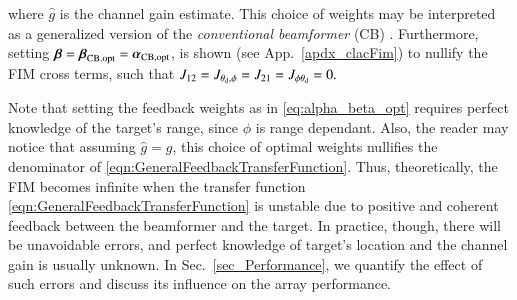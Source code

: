where $\hat{g}$ is the channel gain estimate.
This choice of weights may be interpreted as a generalized version of the \emph{conventional beamformer} (CB) \cite{van2004optimum}. 
Furthermore, setting $\boldsymbol{\beta}=\boldsymbol{\beta}_{\text{CB,opt}}=\boldsymbol{\alpha}_{\text{CB,opt}}$, is shown (see App.~\ref{apdx_clacFim}) to nullify the FIM cross terms, such that $J_{12}=J_{\theta_{\text{d}},\phi}=J_{21}=J_{\phi\theta_{\text{d}}}=0.$
\par Note that setting the feedback weights as in \eqref{eq:alpha_beta_opt} requires perfect knowledge of the target's range, since $\phi$ is range dependant.
Also, the reader may notice that   assuming $\hat{g}=g$, this choice of optimal weights nullifies the denominator of  \eqref{eqn:GeneralFeedbackTransferFunction}. Thus, theoretically, the FIM becomes infinite when the transfer function \eqref{eqn:GeneralFeedbackTransferFunction} is unstable due to positive and coherent feedback between the beamformer and the target. 
In practice, though, there will be unavoidable errors, and perfect knowledge of target's location and the channel gain is usually unknown.
In Sec.~\ref{sec_Performance}, we quantify the effect of such errors and discuss its influence on the array performance. 